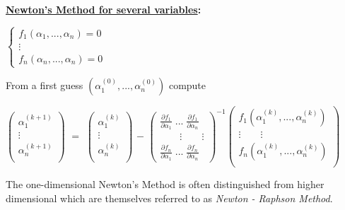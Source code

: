 \documentclass[a4paper,12pt]{report}
\begin{document}
	
	\textbf{\underline{Newton's Method for several variables}:}
	\begin{center}
	$
 	 \left\{
    	\begin{array}{l}
    	f_1(\alpha_1,...,\alpha_n) = 0\\
    	\vdots \\
    	f_n(\alpha_n,...,\alpha_n) = 0
   	\end{array}
  	\right.
	$
\end{center}
	
	\noindent From a first guess $(\alpha_1^{(0)},...,\alpha_n^{(0)})$ compute \\
	\begin{center}
	$
	\begin{pmatrix}
	\alpha_1^{(k+1)}\\
	\vdots \\
	\alpha_n^{(k+1)}\\
	\end{pmatrix}
	$
	$=$
	$
	\begin{pmatrix}
	\alpha_1^{(k)}\\
	\vdots \\
	\alpha_n^{(k)}\\
	\end{pmatrix}
	$
	$-$
	$
	\begin{pmatrix}
	\frac{\partial f_1}{\partial \alpha_1}\; ... \; \frac{\partial f_1}{\partial \alpha_n}\\
	\qquad \vdots \qquad \vdots \\
	\frac{\partial f_n}{\partial \alpha_1}\; ... \; \frac{\partial f_n}{\partial \alpha_n}
	\end{pmatrix}^{-1}
	\begin{pmatrix}
	f_1(\alpha_1^{(k)},...,\alpha_n^{(k)})\\
	\vdots \qquad \vdots \\
	f_n(\alpha_1^{(k)},...,\alpha_n^{(k)})\\
	\end{pmatrix}
	$
	\end{center}

	\noindent The one-dimensional Newton's Method is often distinguished from higher dimensional which are themselves
	referred to as \textit{Newton - Raphson Method}.\\ \\
	
\end{document}
